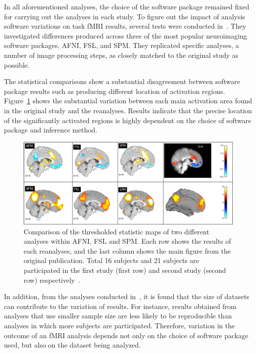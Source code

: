 In all aforementioned analyses, the choice of the software package 
remained fixed for carrying out the analyses in each study. To figure 
out the impact of analysis software variations on task fMRI results, 
several tests were conducted in~\cite{bowring2019exploring}. They 
investigated differences produced across three of the most popular 
neuroimaging software packages, AFNI, FSL, and SPM. They replicated 
specific analyses, a number of image processing steps, as closely 
matched to the original study as possible. 

The statistical comparisons show a substantial disagreement between 
software package results such as producing different location of 
activation regions. 
Figure~\ref{inter_sfw} shows the substantial variation 
between each main activation area found in the original study and the 
reanalyses. Results indicate that the precise location of the significantly 
activated regions is highly dependent on the choice of software package 
and inference method.

\begin{figure}[H]
\centering
	\includegraphics[scale=0.5]{chapters/background/images/inter_sfw} 
	\caption{Comparison of the thresholded statistic maps of two 
	different analyses within AFNI, FSL and SPM. Each row shows the 
	results of each reanalyses, and the last column shows the main 
	figure from the original publication. Total 16 subjects and 21 
	subjects are participated in the first study (first row) and second 
	study (second row) respectively~\cite{bowring2019exploring}.
	\label{inter_sfw}}
\end{figure}

In addition, from the analyses conducted 
in~\cite{bowring2019exploring}, it is found that the size of datasets 
can contribute to the variation of results. For instance, results 
obtained from analyses that use smaller sample size are less likely to 
be reproducible than analyses in which more subjects are participated. 
Therefore, variation in the outcome of an fMRI analysis depends not 
only on the choice of software package used, but also on the dataset 
being analyzed. 



